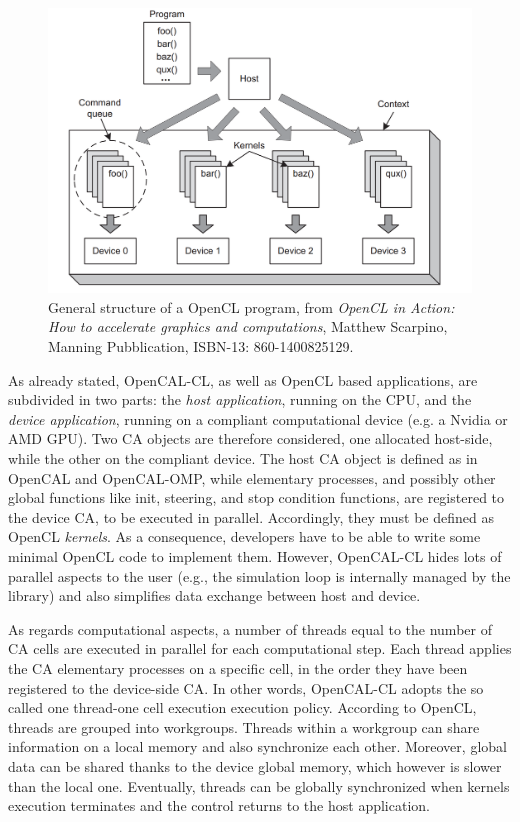 \begin{figure}[tp]
  \begin{center}
    \includegraphics[width=12cm]{./images/OpenCAL-CL/kernelDistribution}
    \caption{General structure of a OpenCL program, from \emph{OpenCL
        in Action: How to accelerate graphics and computations},
      Matthew Scarpino, Manning Pubblication, ISBN-13:
      860-1400825129.}
    \label{fig:GeneralStructure}
  \end{center}
\end{figure}

As already stated, OpenCAL-CL, as well as OpenCL based applications,
are subdivided in two parts: the \emph{host application}, running on
the CPU, and the \emph{device application}, running on a compliant
computational device (e.g. a Nvidia or AMD GPU). Two CA objects are
therefore considered, one allocated host-side, while the other on the
compliant device. The host CA object is defined as in OpenCAL and
OpenCAL-OMP, while elementary processes, and possibly other global
functions like init, steering, and stop condition functions, are
registered to the device CA, to be executed in parallel. Accordingly,
they must be defined as OpenCL \emph{kernels}. As a consequence,
developers have to be able to write some minimal OpenCL code to
implement them. However, OpenCAL-CL hides lots of parallel aspects to
the user (e.g., the simulation loop is internally managed by the
library) and also simplifies data exchange between host and device.

As regards computational aspects, a number of threads equal to the
number of CA cells are executed in parallel for each computational
step. Each thread applies the CA elementary processes on a specific
cell, in the order they have been registered to the device-side CA. In
other words, OpenCAL-CL adopts the so called one thread-one cell
execution execution policy. According to OpenCL, threads are grouped
into workgroups. Threads within a workgroup can share information on a
local memory and also synchronize each other. Moreover, global data
can be shared thanks to the device global memory, which however is
slower than the local one. Eventually, threads can be globally
synchronized when kernels execution terminates and the control
returns to the host application.


